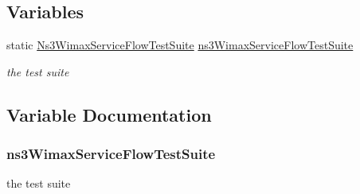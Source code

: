 \subsection*{Variables}
\begin{DoxyCompactItemize}
\item 
static \hyperlink{classNs3WimaxServiceFlowTestSuite}{Ns3\+Wimax\+Service\+Flow\+Test\+Suite} \hyperlink{wimax-service-flow-test_8cc_a79f31d1fdde46f0cd82255cc020f4f18}{ns3\+Wimax\+Service\+Flow\+Test\+Suite}
\begin{DoxyCompactList}\small\item\em the test suite \end{DoxyCompactList}\end{DoxyCompactItemize}


\subsection{Variable Documentation}
\subsubsection[{\texorpdfstring{ns3\+Wimax\+Service\+Flow\+Test\+Suite}{ns3WimaxServiceFlowTestSuite}}]{ ns3\+Wimax\+Service\+Flow\+Test\+Suite\hspace{0.3cm}{\ttfamily [static]}}\hypertarget{wimax-service-flow-test_8cc_a79f31d1fdde46f0cd82255cc020f4f18}{}\label{wimax-service-flow-test_8cc_a79f31d1fdde46f0cd82255cc020f4f18}


the test suite 

